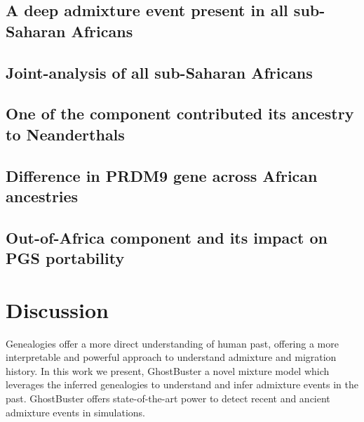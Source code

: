 \subsection{A deep admixture event present in all sub-Saharan Africans}


\subsection{Joint-analysis of all sub-Saharan Africans}


\subsection{One of the component contributed its ancestry to Neanderthals}


\subsection{Difference in PRDM9 gene across African ancestries}


\subsection{Out-of-Africa component and its impact on PGS portability}


\section{Discussion}

Genealogies offer a more direct understanding of human past, offering a more interpretable and powerful approach to understand admixture and migration history. 
In this work we present, GhostBuster a novel mixture model which leverages the inferred genealogies to understand and infer admixture events in the past.
GhostBuster offers state-of-the-art power to detect recent and ancient admixture events in simulations.




